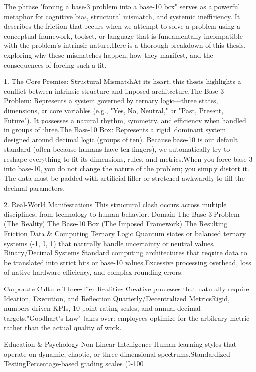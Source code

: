 The phrase "forcing a base-3 problem into a base-10 box" serves as a powerful metaphor for cognitive bias, structural mismatch, and systemic inefficiency. It describes the friction that occurs when we attempt to solve a problem using a conceptual framework, toolset, or language that is fundamentally incompatible with the problem's intrinsic nature.Here is a thorough breakdown of this thesis, exploring why these mismatches happen, how they manifest, and the consequences of forcing such a fit.

1. The Core Premise: Structural MismatchAt its heart, this thesis highlights a conflict between intrinsic structure and imposed architecture.The Base-3 Problem: Represents a system governed by ternary logic—three states, dimensions, or core variables (e.g., "Yes, No, Neutral," or "Past, Present, Future"). It possesses a natural rhythm, symmetry, and efficiency when handled in groups of three.The Base-10 Box: Represents a rigid, dominant system designed around decimal logic (groups of ten). Because base-10 is our default standard (often because humans have ten fingers), we automatically try to reshape everything to fit its dimensions, rules, and metrics.When you force base-3 into base-10, you do not change the nature of the problem; you simply distort it. The data must be padded with artificial filler or stretched awkwardly to fill the decimal parameters.

2. Real-World Manifestations
This structural clash occurs across multiple disciplines, from technology to human behavior.
Domain The Base-3 Problem (The Reality)
The Base-10 Box (The Imposed Framework)
The Resulting Friction Data & Computing Ternary Logic
Quantum states or balanced ternary systems (-1, 0, 1) that naturally handle uncertainty or neutral values.
Binary/Decimal Systems
Standard computing architectures that require data to be translated into strict bits or base-10 values.Excessive processing overhead, loss of native hardware efficiency, and complex rounding errors.

Corporate Culture Three-Tier Realities 
Creative processes that naturally require Ideation, Execution, and Reflection.Quarterly/Decentralized MetricsRigid, numbers-driven KPIs, 10-point rating scales, and annual decimal targets."Goodhart’s Law" takes over: employees optimize for the arbitrary metric rather than the actual quality of work.

Education & Psychology Non-Linear Intelligence
Human learning styles that operate on dynamic, chaotic, or three-dimensional spectrums.Standardized TestingPercentage-based grading scales (0-100%

